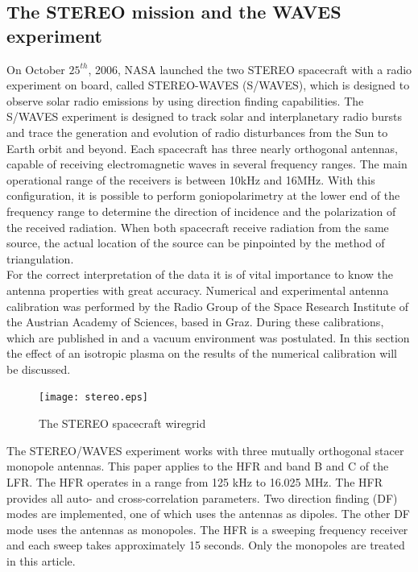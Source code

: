 \documentclass[a4paper,11pt]{article}
\begin{document}
\subsection{The STEREO mission and the WAVES experiment}
On October $25^{th}$, 2006, NASA launched the two STEREO spacecraft with a radio experiment on board, called STEREO-WAVES (S/WAVES), which is designed to observe solar radio emissions by using direction finding capabilities. The S/WAVES experiment is designed to track solar and interplanetary radio bursts and trace the generation and evolution of radio disturbances from the Sun to Earth orbit and beyond. Each spacecraft has three nearly orthogonal antennas, capable of receiving electromagnetic waves in several frequency ranges. The main operational range of the receivers is between 10kHz and 16MHz. With this configuration, it is possible to perform goniopolarimetry at the lower end of the frequency range to determine the direction of incidence and the polarization of the received radiation. When both spacecraft receive radiation from the same source, the actual location of the source can be pinpointed by the method of triangulation.\\

For the correct interpretation of the data it is of vital importance to know the antenna properties with great accuracy. Numerical and experimental antenna calibration was performed by the Radio Group of the Space Research Institute of the Austrian Academy of Sciences, based in Graz. During these calibrations, which are published in \cite{ossi09} and \cite{macher07} a vacuum environment was postulated. In this section the effect of an isotropic plasma on the results of the numerical calibration will be discussed.\\

\begin{figure}
\begin{center}
\texttt{[image: stereo.eps]}
  \caption{The STEREO spacecraft wiregrid}\label{fig:stereo}
\end{center}
\end{figure}

The STEREO/WAVES experiment works with three mutually orthogonal stacer
monopole antennas. This paper applies to the HFR and band B and C of the LFR. The HFR operates in a range from 125 kHz to 16.025 MHz. The HFR provides all auto- and cross-correlation parameters. Two direction finding (DF) modes are implemented, one of which uses the antennas as dipoles. The other DF mode uses
the antennas as monopoles. The HFR is a sweeping frequency receiver and each sweep takes approximately 15 seconds. Only the monopoles are treated in this article.\\
\end{document}
